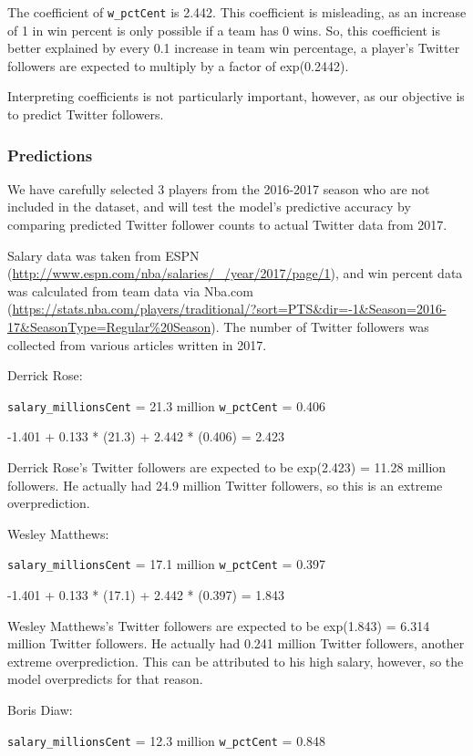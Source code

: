 \documentclass[]{article}
\begin{document}
The coefficient of \texttt{w\_pctCent} is 2.442. This coefficient is
misleading, as an increase of 1 in win percent is only possible if a
team has 0 wins. So, this coefficient is better explained by every 0.1
increase in team win percentage, a player's Twitter followers are
expected to multiply by a factor of exp(0.2442).

Interpreting coefficients is not particularly important, however, as our
objective is to predict Twitter followers.

\hypertarget{predictions}{%
\subsubsection{Predictions}\label{predictions}}

We have carefully selected 3 players from the 2016-2017 season who are
not included in the dataset, and will test the model's predictive
accuracy by comparing predicted Twitter follower counts to actual
Twitter data from 2017.

Salary data was taken from ESPN
(\url{http://www.espn.com/nba/salaries/_/year/2017/page/1}), and win
percent data was calculated from team data via Nba.com
(\url{https://stats.nba.com/players/traditional/?sort=PTS\&dir=-1\&Season=2016-17\&SeasonType=Regular\%20Season}).
The number of Twitter followers was collected from various articles
written in 2017.

Derrick Rose:

\texttt{salary\_millionsCent} = 21.3 million \texttt{w\_pctCent} = 0.406

-1.401 + 0.133 * (21.3) + 2.442 * (0.406) = 2.423

Derrick Rose's Twitter followers are expected to be exp(2.423) = 11.28
million followers. He actually had 24.9 million Twitter followers, so
this is an extreme overprediction.

Wesley Matthews:

\texttt{salary\_millionsCent} = 17.1 million \texttt{w\_pctCent} = 0.397

-1.401 + 0.133 * (17.1) + 2.442 * (0.397) = 1.843

Wesley Matthews's Twitter followers are expected to be exp(1.843) =
6.314 million Twitter followers. He actually had 0.241 million Twitter
followers, another extreme overprediction. This can be attributed to his
high salary, however, so the model overpredicts for that reason.

Boris Diaw:

\texttt{salary\_millionsCent} = 12.3 million \texttt{w\_pctCent} = 0.848
\end{document}
